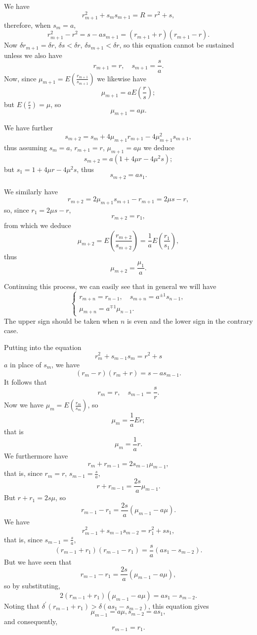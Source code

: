 \documentclass[oneside, 12 pt, leqno]{memoir}
\begin{document}
We have
\[r_{m+1}^2+s_m s_{m+1}=R=r^2+s,\]
therefore, when \(s_m=a\),
\[r_{m+1}^2-r^2=s-a s_{m+1}=\left(r_{m+1}+r\right)\left(r_{m+1}-r\right ).\]
Now \(\delta r_{m+1}=\delta r\), \(\delta s<\delta r\), \(\delta s_{m+1}<\delta r\), so this equation cannot be sustained unless we also have
\[r_{m+1}=r, \quad s_{m+1}=\frac{s}{a}.\]
Now, since \(\mu_{m+1}=E\left(\frac{r_{m+1}}{s_{m+1}}\right)\) we likewise have
\[\mu_{m+1}=a E\left(\frac{r}{s}\right);\]
but \(E\left(\frac{r}{s}\right)=\mu\), so
\[\mu_{m+1}=a \mu .\]

We have further
\[s_{m+2}=s_m+4 \mu_{m+1} r_{m+1}-4 \mu_{m+1}^2 s_{m+1},\]
thus assuming \(s_m=a\), \(r_{m+1}=r\), \(\mu_{m+1}=a \mu\) we deduce
\[s_{m+2}=a\left(1+4 \mu r-4 \mu^2 s\right);\]
but \(s_1=1+4 \mu r-4 \mu^2 s\), thus
\[s_{m+2}=a s_1.\]

We similarly have
\[r_{m+2}=2 \mu_{m+1} s_{m+1}-r_{m+1}=2 \mu s-r,\]
so, since \(r_1=2 \mu s-r\),
\[r_{m+2}=r_1,\]
from which we deduce
\[\mu_{m+2}=E\left(\frac{r_{m+2}}{s_{m+2}}\right)=\frac{1}{a} E\left(\frac{r_1}{s_1}\right),\]
thus
\[\mu_{m+2}=\frac{\mu_1}{a}.\]

Continuing this process, we can easily see that in general we will have
\[\tag{41}\left\{\begin{array}{l} r_{m+n}=r_{n-1}, \quad s_{m+n}=a^{\pm1} s_{n-1}, \\
\mu_{m+n}=a^{\mp 1} \mu_{n-1}. \end{array}\right.\]
The upper sign should be taken when \(n\) is even and the lower sign in the contrary case.

Putting into the equation
\[r_m^2+s_{m-1} s_m=r^2+s\]
\(a\) in place of \(s_m\), we have
\[\left(r_m-r\right)\left(r_m+r\right)=s-a s_{m-1}.\]
It follows that
\[ r_m=r, \quad s_{m-1}=\frac{s}{r}.\]
Now we have \(\mu_m=E\left(\frac{r_m}{s_m}\right)\), so
\[\mu_m=\frac{1}{a} E r;\]
that is
\[\mu_m=\frac{1}{a} r.\]
We furthermore have
\[r_m+r_{m-1}=2 s_{m-1} \mu_{m-1},\]
that is, since \(r_m=r\), \(s_{m-1}=\frac{s}{a}\),
\[r+r_{m-1}=\frac{2 s}{a} \mu_{m-1}.\]
But \(r+r_1=2 s \mu\), so
\[r_{m-1}-r_1=\frac{2 s}{a}\left(\mu_{m-1}-a \mu\right).\]
We have
\[r_{m-1}^2+s_{m-1} s_{m-2}=r_1^2+s s_1,\]
that is, since \(s_{m-1}=\frac{s}{a}\),
\[\left(r_{m-1}+r_1\right)\left(r_{m-1}-r_1\right)=\frac{s}{a}\left(a s_1-s_{m-2}\right).\]
But we have seen that
\[r_{m-1}-r_1=\frac{2 s}{a}\left(\mu_{m-1}-a \mu\right),\]
so by substituting,
\[2\left(r_{m-1}+r_1\right)\left(\mu_{m-1}-a \mu\right)=a s_1-s_{m-2}.\]
Noting that \(\delta^{\prime}\left(r_{m-1}+r_1\right)>\delta\left(a s_1-s_{m-2}\right)\), this equation gives
\[\mu_{m-1}=a \mu, s_{m-2}=a s_1,\]
and consequently,
\[r_{m-1}=r_1.\]
\end{document}

